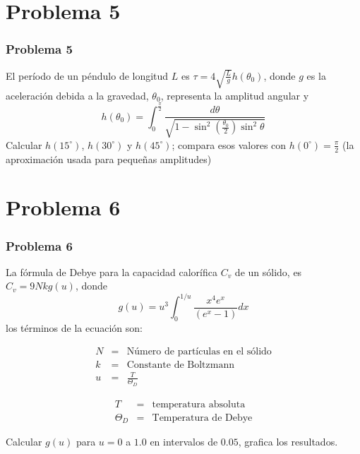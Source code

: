 \documentclass[12pt]{beamer}
\begin{document}
\section{Problema 5}
\begin{frame}
\frametitle{Problema 5}
El per\'{i}odo de un p\'{e}ndulo de longitud $L$ es $\tau = 4 \sqrt{\frac{L}{g}} h(\theta_{0})$, donde $g$ es la aceleraci\'{o}n debida a la gravedad, $\theta_{0}$, representa la amplitud angular y 
\[ h(\theta_{0}) =  \int_{0}^{\frac{\pi}{2}} \dfrac{d\theta}{\sqrt{1 - \sin^{2} \left( \frac{\theta_{0}}{2}\right) \sin^{2} \theta}} \]
Calcular $h(15^{\circ})$, $h(30^{\circ})$ y $h(45^{\circ})$; compara esos valores con $h(0^{\circ}) = \frac{\pi}{2}$ (la aproximaci\'{o}n usada para pequeñas amplitudes)
\end{frame}
\section{Problema 6}
\begin{frame}[fragile]
\frametitle{Problema 6}
La f\'{o}rmula de Debye para la capacidad calor\'{i}fica $C_{v}$ de un s\'{o}lido, es $C_{v} = 9 Nkg(u)$, donde
\[g(u) = u^{3} \int_{0}^{1/u} \dfrac{x^{4}e^{x}}{(e^{x}-1)}dx\]
los t\'{e}rminos de la ecuaci\'{o}n son:
\\
\medskip
\fontsize{10}{10}\selectfont
\begin{minipage}{4cm}
\begin{eqnarray*}
N &=& \text{N\'{u}mero de part\'{i}culas en el s\'{o}lido} \\
k &=& \text{Constante de Boltzmann} \\
u &=& \frac{T}{\Theta_{D}}
\end{eqnarray*}
\end{minipage}
\hspace{1.5cm}
\begin{minipage}{4cm}
\begin{eqnarray*}
T &=& \text{temperatura absoluta} \\
\Theta_{D} &=& \text{Temperatura de Debye}
\end{eqnarray*}
\end{minipage}
\fontsize{12}{12}\selectfont
Calcular $g(u)$ para $u=0$ a $1.0$ en intervalos de $0.05$, grafica los resultados.
\end{frame}
\end{document}
